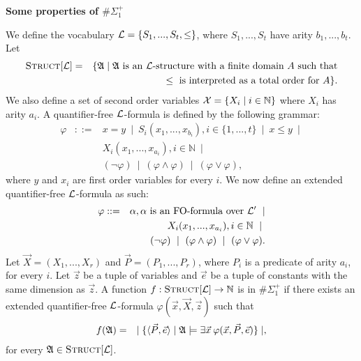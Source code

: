 \documentclass[12pt]{article}
\def\A{{\frak A}}
\def\L{{\cal L}}
\def\N{\mathbb{N}}
\def\P{\vec{P}}
\def\X{\vec{X}}
\def\e{\vec{e}}
\def\x{\vec{x}}
\def\z{\vec{z}}
\begin{document}
\begin{center}
{ \LARGE \bf
  Some properties of $\#\Sigma_1^{+}$
}
\end{center}

We define the vocabulary $\L = \{ S_1,...,S_t, \leq \}$, where $S_1,...,S_t$ have arity $b_1,...,b_t$. Let
\begin{eqnarray*}
\textsc{Struct}[\L] &=& \{\A \mid \A \text{ is an } \L \text{-structure with a finite domain } A \text{ such that} \\
&& \leq \text{ is interpreted as a total order for } A \}.
\end{eqnarray*}
We also define a set of second order variables ${\cal X} = \{ X_i \mid i\in\N \}$ where $X_i$ has arity $a_i$. A quantifier-free $\L$-formula is defined by the following grammar:
\begin{eqnarray*}
\varphi &::=& x = y \ \mid \ S_i(x_1,...,x_{b_i}), i \in \{1,...,t\} \ \mid \ x \leq y \ \mid \\
&& X_i(x_1,...,x_{a_i}), i\in\N \ \mid \\ 
&& (\neg \varphi) \ \mid \ (\varphi \wedge \varphi) \ \mid \ (\varphi \vee \varphi),
\end{eqnarray*}
where $y$ and $x_i$ are first order variables for every $i$. We now define an extended quantifier-free $\L$-formula as such:
\begin{eqnarray*}
\varphi &::=& \alpha, \alpha \text{ is an FO-formula over } \L^\prime  \ \mid \\
&& X_i(x_1,...,x_{a_i}), i\in\N \ \mid \ \\
&& (\neg \varphi) \ \mid \ (\varphi \wedge \varphi) \ \mid \ (\varphi \vee \varphi).
\end{eqnarray*}
Let $\X = (X_1,...,X_r)$ and $\P = (P_1,...,P_r)$, where $P_i$ is a predicate of arity $a_i$, for every $i$. Let $\z$ be a tuple of variables and $\e$ be a tuple of constants with the same dimension as $\z$. A function $f:\textsc{Struct}[\L] \to \mathbb{N}$ is in $\#\Sigma_1^+$ if there exists an extended quantifier-free $\L$-formula $\varphi(\x,\X,\z)$ such that
\begin{eqnarray*}
f(\A) &=& \mid \{ \langle \P, \e \rangle \mid \A \models \exists \x \: \varphi(\x,\P,\e) \} \mid,
\end{eqnarray*}
for every $\A \in \textsc{Struct}[\L]$.
\end{document}
